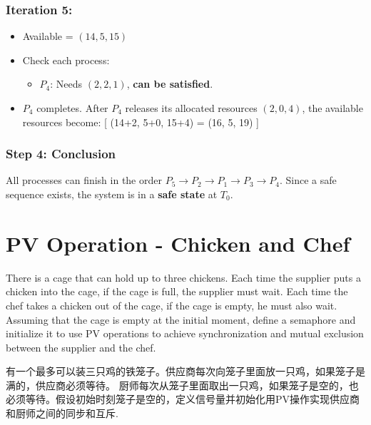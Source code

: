 \documentclass[a4paper]{book}
\begin{document}
\subsubsection{Iteration 5:}
\begin{itemize}
\item 
Available = \( (14, 5, 15) \)

\item 
Check each process:
\begin{itemize}
\item 
\( P_4 \): Needs \( (2, 2, 1) \), \textbf{can be satisfied}.

\end{itemize}

\item 
\( P_4 \) completes. After \( P_4 \) releases its allocated resources \( (2, 0, 4) \), the available resources become:
[
(14+2, 5+0, 15+4) = (16, 5, 19)
]

\end{itemize}

\hrulefill

\subsubsection{Step 4: Conclusion}

All processes can finish in the order \( P_5 \rightarrow P_2 \rightarrow P_1 \rightarrow P_3 \rightarrow P_4 \). Since a safe sequence exists, the system is in a \textbf{safe state} at \( T_0 \).

\section{PV Operation - Chicken and Chef}

\begin{greenbox}
There is a cage that can hold up to three chickens. Each time the supplier puts a chicken into the cage, if the cage is full, the supplier must wait. Each time the chef takes a chicken out of the cage, if the cage is empty, he must also wait. Assuming that the cage is empty at the initial moment, define a semaphore and initialize it to use PV operations to achieve synchronization and mutual exclusion between the supplier and the chef.
\end{greenbox}

有一个最多可以装三只鸡的铁笼子。供应商每次向笼子里面放一只鸡，如果笼子是满的，供应商必须等待。 厨师每次从笼子里面取出一只鸡，如果笼子是空的，也必须等待。假设初始时刻笼子是空的，定义信号量并初始化用PV操作实现供应商和厨师之间的同步和互斥.
\end{document}
